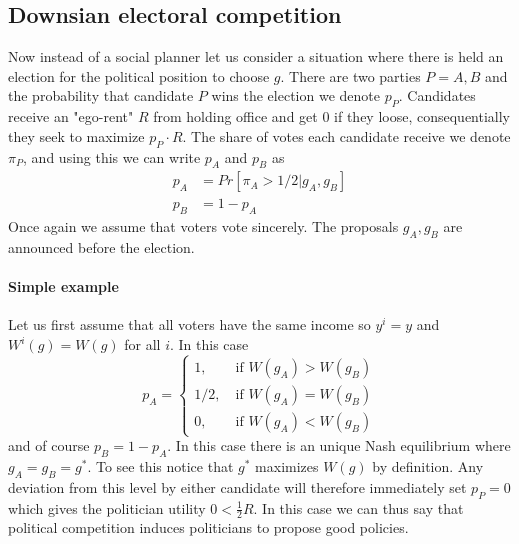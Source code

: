 \subsection{Downsian electoral competition}
Now instead of a social planner let us consider a situation where there is held an election for the political position to choose $g$. There are two parties $P=A,B$ and the probability that candidate $P$ wins the election we denote $p_P$. Candidates receive an "ego-rent" $R$ from holding office and get 0 if they loose, consequentially they seek to maximize $p_P \cdot R$. The share of votes each candidate receive we denote $\pi_P$, and using this we can write $p_A$ and $p_B$ as 
\begin{equation}
    \begin{split}
        p_A &= Pr[\pi_A > 1/2 | g_A, g_B] \\ 
        p_B &= 1-p_A
    \end{split}
\end{equation}
Once again we assume that voters vote sincerely. The proposals $g_A, g_B$ are announced before the election. 

\paragraph{Simple example} Let us first assume that all voters have the same income so $y^i=y$ and $W^i(g)=W(g)$ for all $i$. In this case 
\begin{equation}
 p_A =  
    \begin{cases}
       1, \qquad \text{if } W(g_A) > W(g_B) \\ 
       1/2, \quad \text{if } W(g_A) = W(g_B) \\
       0, \qquad \text{if } W(g_A) < W(g_B) 
    \end{cases}
\end{equation}
and of course $p_B=1-p_A$. In this case there is an unique Nash equilibrium where $g_A=g_B=g^*$. To see this notice that $g^*$ maximizes $W(g)$ by definition. Any deviation from this level by either candidate will therefore immediately set $p_P=0$ which gives the politician utility $0<\frac{1}{2}R$. In this case we can thus say that political competition induces politicians to propose good policies.

